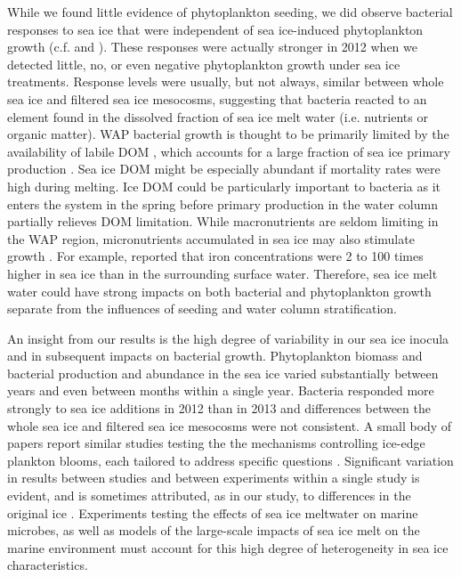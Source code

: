 While we found little evidence of phytoplankton seeding, we did observe bacterial responses to sea ice that were independent of sea ice-induced phytoplankton growth (c.f. \citealt{Lannuzel2013-gk} and \citealt{Giesenhagen1999-kq}). These responses were actually stronger in 2012 when we detected little, no, or even negative phytoplankton growth under sea ice treatments. Response levels were usually, but not always, similar between whole sea ice and filtered sea ice mesocosms, suggesting that bacteria reacted to an element found in the dissolved fraction of sea ice melt water (i.e. nutrients or organic matter). WAP bacterial growth is thought to be primarily limited by the availability of labile DOM \citep{dsvse12,Kirchman2009-sg}, which accounts for a large fraction of sea ice primary production \citep{Gosselin1997-qs}. Sea ice DOM might be especially abundant if mortality rates were high during melting. Ice DOM could be particularly important to bacteria as it enters the system in the spring before primary production in the water column partially relieves DOM limitation. While macronutrients are seldom limiting in the WAP region, micronutrients accumulated in sea ice may also stimulate growth \citep{Martin1990-ly}. For example, \citep{Loscher1997-ii} reported that iron concentrations were 2 to 100 times higher in sea ice than in the surrounding surface water. Therefore, sea ice melt water could have strong impacts on both bacterial and phytoplankton growth separate from the influences of seeding and water column stratification.

An insight from our results is the high degree of variability in our sea ice inocula and in subsequent impacts on bacterial growth. Phytoplankton biomass and bacterial production and abundance in the sea ice varied substantially between years and even between months within a single year. Bacteria responded more strongly to sea ice additions in 2012 than in 2013 and differences between the whole sea ice and filtered sea ice mesocosms were not consistent. A small body of papers report similar studies testing the the mechanisms controlling ice-edge plankton blooms, each tailored to address specific questions \citep{Giesenhagen1999-kq,Kuosa1992-vk,Lannuzel2013-gk,Riebesell1991-xy}. Significant variation in results between studies and between experiments within a single study is evident, and is sometimes attributed, as in our study, to differences in the original ice \citep{Kuosa1992-vk}. Experiments testing the effects of sea ice meltwater on marine microbes, as well as models of the large-scale impacts of sea ice melt on the marine environment must account for this high degree of heterogeneity in sea ice characteristics.

